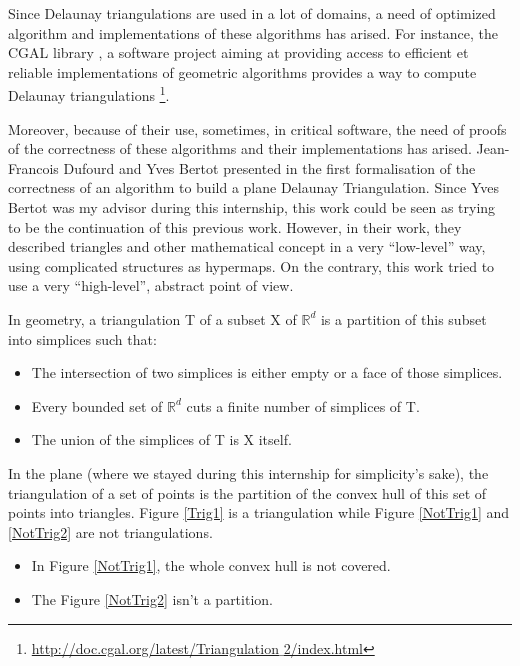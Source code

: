 \documentclass[a4paper,10pt]{article}
\begin{document}
Since Delaunay triangulations are used in a lot of domains, a need of optimized algorithm and implementations of these algorithms has arised. For instance, the CGAL library \cite{cgal}, a software project aiming at providing access to efficient et reliable implementations of geometric algorithms provides a way to compute Delaunay triangulations \footnote{\href{http://doc.cgal.org/latest/Triangulation_2/index.html}{http://doc.cgal.org/latest/Triangulation$\_$2/index.html}}.

Moreover, because of their use, sometimes, in critical software, the need of proofs of the correctness of these algorithms and their implementations has arised. Jean-Francois Dufourd and Yves Bertot presented in \cite{Bertot} the first formalisation of the correctness of an algorithm to build a plane Delaunay Triangulation. Since Yves Bertot was my advisor during this internship, this work could be seen as trying to be the continuation of this previous work. However, in their work, they described triangles and other mathematical concept in a very ``low-level'' way, using complicated structures as hypermaps. On the contrary, this work tried to use a very ``high-level'', abstract point of view.

In geometry, a triangulation T of a subset X of $\mathbb{R}^d$ is a partition of this subset into simplices such that: 
\begin{itemize}
\item The intersection of two simplices is either empty or a face of those simplices.
\item Every bounded set of $\mathbb{R}^{d}$ cuts a finite number of simplices of T.
  \item The union of the simplices of T is X itself. \label{deftriangulation}
\end{itemize}

In the plane (where we stayed during this internship for simplicity's sake), the triangulation of a set of points is the partition of the convex hull of this set of points into triangles. Figure \ref{Trig1} is a triangulation while Figure \ref{NotTrig1} and \ref{NotTrig2} are not triangulations.
\begin{itemize}
\item In Figure \ref{NotTrig1}, the whole convex hull is not covered.
\item The Figure \ref{NotTrig2} isn't a partition.
 \end{itemize}
\end{document}
